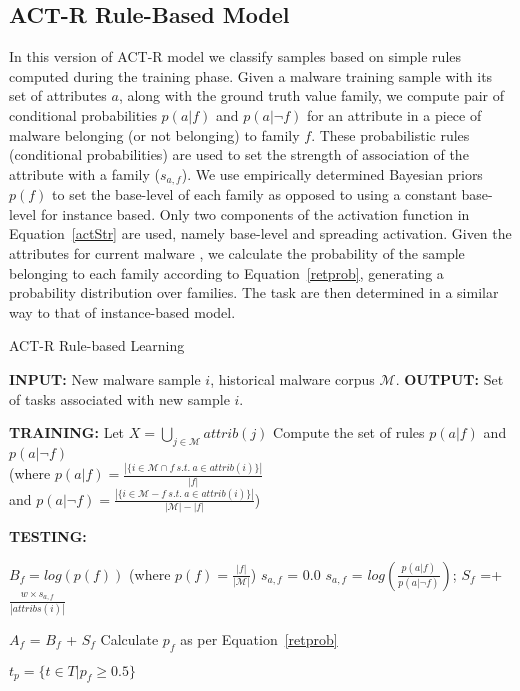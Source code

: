 \documentclass[conference]{IEEEtran}
\def\Pr{p}
\def\M{\mathcal{M}}
\def\attrib{\textit{attribs}}
\def\F{\mathcal{F}}
\begin{document}
\subsection{ACT-R Rule-Based Model}
In this version of ACT-R model we classify samples based on simple rules computed during the training phase. Given a malware training sample with its set of attributes $a$, along with the ground truth value family, we compute pair of conditional probabilities $p(a | f)$ and $p(a | \neg f)$ for an attribute in a piece of malware belonging (or not belonging) to family $f$. These probabilistic rules (conditional probabilities) are used to set the strength of association of the attribute with a family ($s_{a,f}$). We use empirically determined Bayesian priors $p(f)$ to set the base-level of each family as opposed to using a constant base-level for instance based. Only two components of the activation function in Equation~\ref{actStr} are used, namely base-level and spreading activation. Given the attributes for current malware , we calculate the probability of the sample belonging to each family according to Equation~\ref{retprob}, generating a probability distribution over families. The task are then determined in a similar way to that of instance-based model. \smallskip

\begin{algorithm}[]
	\caption{ACT-R Rule-based Learning}
	\begin{algorithmic}
		
		\STATE \textbf {INPUT:} New malware sample $i$, historical malware corpus $\M$.
		\STATE \textbf {OUTPUT:} Set of tasks associated with new sample $i$.
		
		
		\STATE \textbf{TRAINING:}
		\STATE Let $X=\bigcup_{j \in \M}attrib(j)$
		\STATE Compute the set of rules $p(a | f)$ and $p(a |\neg f)$\\ (where $p( a | f)=\frac{|\{i \in \M\cap f \ s.t.\ a \in attrib(i)\}|}{|f|}$\\ and $p( a | \neg f)=\frac{|\{i \in \M - f \ s.t. \ a \in attrib(i)\}|}{|\M|-|f|}$)
		\ENDFOR
		
		\STATE \textbf{TESTING:}
		
		\FORALL {$f\in \F$}
		\STATE $B_f = log(p(f))$ (where $p(f)=\frac{|f|}{|\M|}$)
		\STATE $s_{a,f}$ = 0.0
		\STATE $s_{a,f}$ = $log(\frac{p(a |f)}{p(a | \neg f)})$; $S_f$ =+ $\frac{w\times s_{a,f}}{|\attrib(i)|}$
		
		\ENDFOR
		
		\STATE $A_f$ = $B_f$ + $S_f$
		\ENDFOR
		\STATE Calculate $\Pr_f$ as per Equation~\ref{retprob}
		
		\STATE $t_p = \{t \in  T | p_f\geq0.5\}$
		
	
		
	\end{algorithmic}
\end{algorithm}
\end{document}
